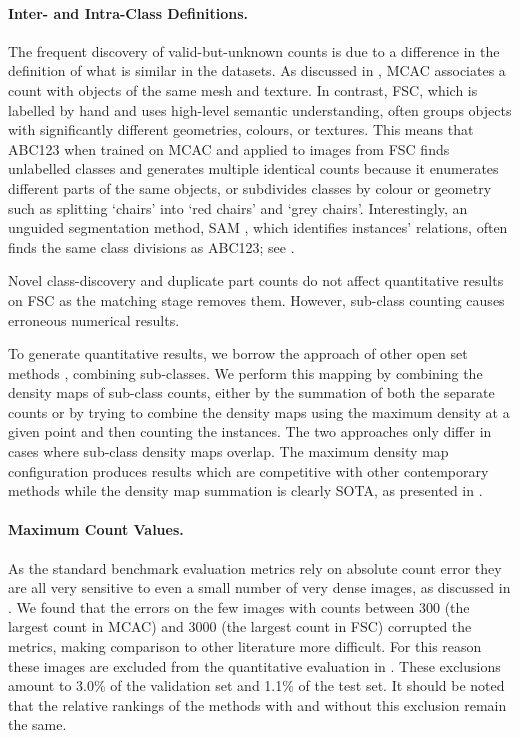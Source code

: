 \documentclass[../thesis.tex]{subfiles}
\begin{document}
\paragraph{Inter- and Intra-Class Definitions.}\hspace{-5pt}
The frequent discovery of valid-but-unknown counts is due to a difference in the definition of what is similar in the datasets. As discussed in , MCAC associates a count with objects of the same mesh and texture. 
In contrast, FSC, which is labelled by hand and uses high-level semantic understanding, often groups objects with significantly different geometries, colours, or textures. 
This means that ABC123 when trained on MCAC and applied to images from FSC finds unlabelled classes and generates multiple identical counts
because it enumerates different parts of the same objects, or subdivides classes by colour or geometry such as splitting `chairs' into `red chairs' and `grey chairs'.
Interestingly, an unguided segmentation method, SAM \cite{kirillov2023segany}, which identifies instances' relations, often finds the same class divisions as ABC123; see .

Novel class-discovery and duplicate part counts do not affect quantitative results on FSC as the matching  stage removes them. However, sub-class counting causes erroneous numerical results.

To generate quantitative results, we borrow the approach of other open set methods \cite{ma2023can, hobley2023dms, kirillov2023segany}, combining sub-classes. 
We perform this mapping by combining the density maps of sub-class counts, either by the summation of both the separate counts or by trying to combine the density maps using the maximum density at a given point and then counting the instances. The two approaches only differ in cases where sub-class density maps overlap. The maximum density map configuration produces results which are competitive with other contemporary methods while the density map summation is clearly SOTA, as presented in .  

\paragraph{Maximum Count Values.}
As the standard benchmark evaluation metrics rely on absolute count error they are all very sensitive to even a small number of very dense images, as discussed in .
We found that the errors on the few images with counts between 300 (the largest count in MCAC) and 3000 (the largest count in FSC) corrupted the metrics, making comparison to other literature more difficult. 
For this reason these images are excluded from the quantitative evaluation in . These exclusions amount to 3.0\% of the validation set and 1.1\% of the test set. It should be noted that the relative rankings of the methods with and without this exclusion remain the same.
\end{document}
